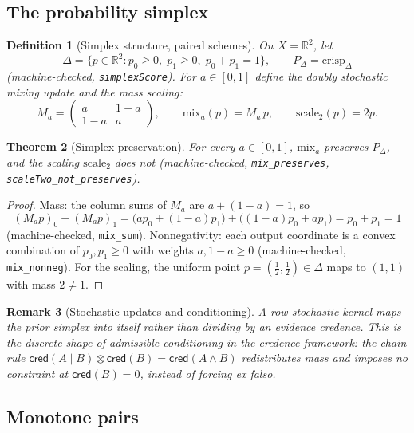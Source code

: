 \documentclass[11pt,a4paper]{article}
\newtheorem{theorem}{Theorem}[section]
\newtheorem{definition}[theorem]{Definition}
\newtheorem{remark}[theorem]{Remark}
\newcommand{\cred}{\mathsf{cred}}
\newcommand{\conjc}{\otimes}
\newcommand{\Real}{\mathbb{R}}
\begin{document}
\subsection{The probability simplex}

\begin{definition}[Simplex structure, paired schemes]
\label{def:simplex}
On $X = \Real^2$, let
\[
  \Delta = \{ p \in \Real^2 : p_0 \ge 0,\; p_1 \ge 0,\;
              p_0 + p_1 = 1 \},
  \qquad
  P_\Delta = \mathrm{crisp}_\Delta
\]
(machine-checked, \texttt{simplexScore}).
For $a \in [0,1]$ define the doubly stochastic mixing update and the
mass scaling:
\[
  M_a =
  \begin{pmatrix} a & 1-a \\ 1-a & a \end{pmatrix},
  \qquad
  \mathrm{mix}_a(p) = M_a\,p,
  \qquad
  \mathrm{scale}_2(p) = 2 p .
\]
\end{definition}

\begin{theorem}[Simplex preservation]
\label{thm:simplex}
For every $a \in [0,1]$, $\mathrm{mix}_a$ preserves $P_\Delta$, and
the scaling $\mathrm{scale}_2$ does not
(machine-checked, \texttt{mix\_preserves},
\texttt{scaleTwo\_not\_preserves}).
\end{theorem}
\begin{proof}
Mass: the column sums of $M_a$ are $a + (1-a) = 1$, so
\[
  (M_a p)_0 + (M_a p)_1
  = \bigl(a p_0 + (1-a) p_1\bigr) + \bigl((1-a) p_0 + a p_1\bigr)
  = p_0 + p_1 = 1
\]
(machine-checked, \texttt{mix\_sum}).
Nonnegativity: each output coordinate is a convex combination of
$p_0, p_1 \ge 0$ with weights $a, 1-a \ge 0$
(machine-checked, \texttt{mix\_nonneg}).
For the scaling, the uniform point
$p = (\tfrac{1}{2}, \tfrac{1}{2}) \in \Delta$ maps to $(1,1)$ with mass
$2 \neq 1$.
\end{proof}

\begin{remark}[Stochastic updates and conditioning]
A row-stochastic kernel maps the prior simplex into itself rather than
dividing by an evidence credence.
This is the discrete shape of admissible conditioning in the credence
framework: the chain rule
$\cred(A \mid B) \conjc \cred(B) = \cred(A \wedge B)$ redistributes
mass and imposes no constraint at $\cred(B) = 0$, instead of forcing
ex falso.
\end{remark}

\subsection{Monotone pairs}
\end{document}
